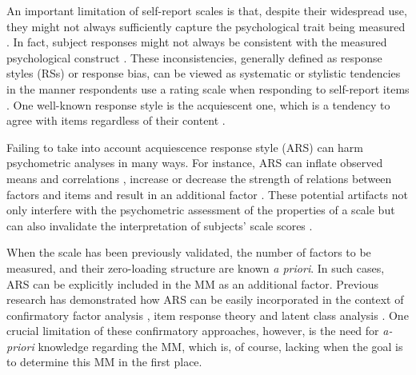 \documentclass[a4paper,man,natbib]{apa6}
\begin{document}
\begin{linenumbers}
An important limitation of self-report scales is that, despite their widespread use, they might not always sufficiently capture the psychological trait being measured \citep{van2013response}. In fact, subject responses might not always be consistent with the measured psychological construct \citep{bolt2009addressing}. These inconsistencies, generally defined as response styles (RSs) or response bias, can be viewed as systematic or stylistic tendencies in the manner respondents use a rating scale when responding to self-report items \citep{paulhus1991measurement}. One well-known response style is the acquiescent one, which is a tendency to agree with items regardless of their content \citep{van2013response}.


Failing to take into account acquiescence response style (ARS) can harm psychometric analyses in many ways. For instance, ARS can inflate observed means and correlations \citep{van2013response}, increase or decrease the strength of relations between factors and items \citep{ferrando2010acquiescence} and result in an additional factor \citep{billiet2000modeling}. These potential artifacts not only interfere with the psychometric assessment of the properties of a scale but can also invalidate the interpretation of subjects' scale scores \citep{bolt2009addressing}. %

When the scale has been previously validated, the number of factors to be measured, and their zero-loading structure are known \textit{a priori}. In such cases, ARS can be explicitly included in the MM as an additional factor. Previous research has demonstrated how ARS can be easily incorporated in the context of confirmatory factor analysis \citep{billiet2000modeling}, item response theory \citep{falk2016flexible} and latent class analysis \citep{morren2011dealing}. One crucial limitation of these confirmatory approaches, however, is the need for \textit{a-priori} knowledge regarding the MM, which is, of course, lacking when the goal is to determine this MM in the first place. 


\end{linenumbers}
\end{document}
